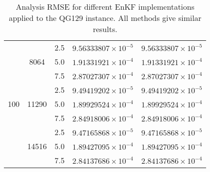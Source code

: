 \documentclass[12pt]{article}
\begin{document}
\begin{table}[H]
{\begin{tabular}{|c|c|c|c|c|}
\cline{1-5}
\multirow{9}{*}{100} &  \multirow{3}{*}{8064}  & 2.5 & $9.56333807 \times 10^{-5}$ & $9.56333807 \times 10^{-5} $ \\
& & 5.0 & $ 1.91331921 \times 10^{-4} $ & $ 1.91331921 \times 10^{-4} $   \\ 
& & 7.5 & $ 2.87027307 \times 10^{-4} $ & $ 2.87027307 \times 10^{-4} $   \\ 
\cline{2-5}
&  \multirow{3}{*}{11290}  & 2.5 & $ 9.49419202 \times 10^{-5} $ & $ 9.49419202 \times 10^{-5} $  \\
& & 5.0 & $ 1.89929524 \times 10^{-4} $ & $ 1.89929524 \times 10^{-4} $   \\ 
& & 7.5 & $ 2.84918006 \times 10^{-4} $ & $ 2.84918006 \times 10^{-4} $   \\ 
\cline{2-5}
&  \multirow{3}{*}{14516}  & 2.5 & $ 9.47165868 \times 10^{-5} $ & $ 9.47165868 \times 10^{-5} $  \\
& & 5.0 & $ 1.89427095 \times 10^{-4} $ & $ 1.89427095 \times 10^{-4} $   \\ 
& & 7.5 & $ 2.84137686 \times 10^{-4} $ & $ 2.84137686 \times 10^{-4} $   \\ 
\hline
\end{tabular}
}
\caption{Analysis RMSE for different EnKF implementations applied to the QG129 instance.
All methods give similar results.}
\label{Tab:QG129-Results-RMSE}
\end{table}
\end{document}
